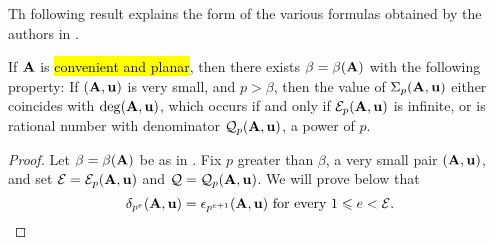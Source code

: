 \documentclass{article}
\begin{document}
Th following result explains the form of the various formulas obtained by the authors in \cite[Theorems~3.6, 4.8, and~5.5]{hernandez+etal.frobenius_examples}.

\begin{proposition}  If $\mathbf{A}$ is \hl{convenient and planar}, then there exists $\beta = \beta(\mathbf{A})$ with the following property:  If $(\mathbf{A}, \mathbf{u})$ is very small, and $p>\beta$, then the value of $\Sigma_p(\mathbf{A}, \mathbf{u})$ either coincides with $\deg(\mathbf{A}, \mathbf{u})$, which occurs if and only if $\mathcal{E}_p(\mathbf{A}, \mathbf{u})$ is infinite, or is rational number with denominator $\mathcal{Q}_p(\mathbf{A}, \mathbf{u})$, a power of $p$.

\begin{proof}  Let $\beta = \beta(\mathbf{A})$ be as in .  Fix $p$ greater than $\beta$, a very small pair  $(\mathbf{A}, \mathbf{u})$, and set $\mathcal{E} = \mathcal{E}_p(\mathbf{A}, \mathbf{u})$ and $\mathcal{Q} = \mathcal{Q}_p(\mathbf{A}, \mathbf{u})$.  We will prove below that
\begin{equation}
\label{delta-epsilon-for-convenient-planar-pairs: e}
\delta_{p^e}(\mathbf{A}, \mathbf{u}) = \epsilon_{p^{e+1}}(\mathbf{A}, \mathbf{u}) \text{ for every }1 \leqslant e < \mathcal{E}.
\end{equation}

\end{proof}

\end{proposition}
\end{document}
